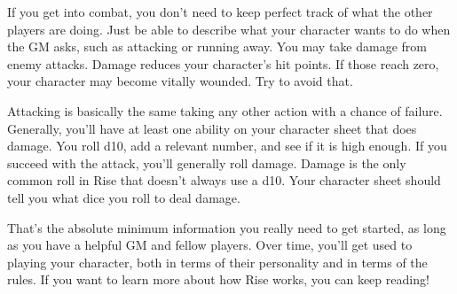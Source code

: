   If you get into combat, you don't need to keep perfect track of what the other players are doing.
  Just be able to describe what your character wants to do when the GM asks, such as attacking or running away.
  You may take damage from enemy attacks.
  Damage reduces your character's hit points.
  If those reach zero, your character may become vitally wounded.
  Try to avoid that.

  Attacking is basically the same taking any other action with a chance of failure.
  Generally, you'll have at least one ability on your character sheet that does damage.
  You roll d10, add a relevant number, and see if it is high enough.
  If you succeed with the attack, you'll generally roll damage.
  Damage is the only common roll in Rise that doesn't always use a d10.
  Your character sheet should tell you what dice you roll to deal damage.

  That's the absolute minimum information you really need to get started, as long as you have a helpful GM and fellow players.
  Over time, you'll get used to playing your character, both in terms of their personality and in terms of the rules.
  If you want to learn more about how Rise works, you can keep reading!
